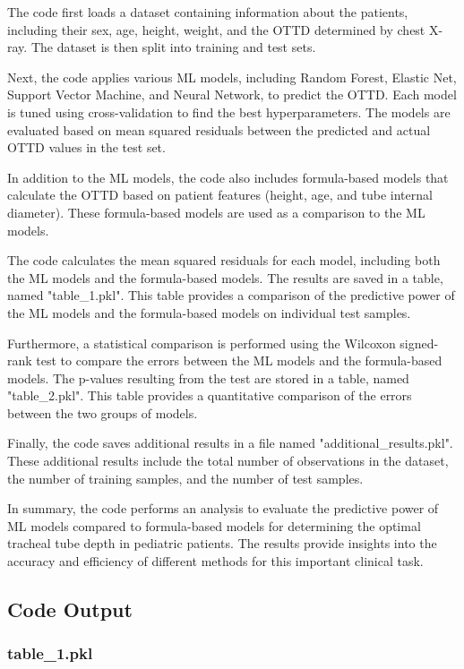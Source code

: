 \documentclass[11pt]{article}
\begin{document}
The code first loads a dataset containing information about the patients, including their sex, age, height, weight, and the OTTD determined by chest X-ray. The dataset is then split into training and test sets.

Next, the code applies various ML models, including Random Forest, Elastic Net, Support Vector Machine, and Neural Network, to predict the OTTD. Each model is tuned using cross-validation to find the best hyperparameters. The models are evaluated based on mean squared residuals between the predicted and actual OTTD values in the test set.

In addition to the ML models, the code also includes formula-based models that calculate the OTTD based on patient features (height, age, and tube internal diameter). These formula-based models are used as a comparison to the ML models.

The code calculates the mean squared residuals for each model, including both the ML models and the formula-based models. The results are saved in a table, named "table\_1.pkl". This table provides a comparison of the predictive power of the ML models and the formula-based models on individual test samples.

Furthermore, a statistical comparison is performed using the Wilcoxon signed-rank test to compare the errors between the ML models and the formula-based models. The p-values resulting from the test are stored in a table, named "table\_2.pkl". This table provides a quantitative comparison of the errors between the two groups of models.

Finally, the code saves additional results in a file named "additional\_results.pkl". These additional results include the total number of observations in the dataset, the number of training samples, and the number of test samples.

In summary, the code performs an analysis to evaluate the predictive power of ML models compared to formula-based models for determining the optimal tracheal tube depth in pediatric patients. The results provide insights into the accuracy and efficiency of different methods for this important clinical task.

\subsection{Code Output}

\subsubsection*{table\_1.pkl}
\end{document}
